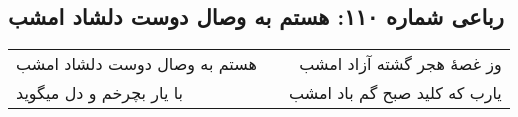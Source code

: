 \begin{center}
\section*{رباعی شماره ۱۱۰: هستم به وصال دوست دلشاد امشب}
\label{sec:0110}
\begin{longtable}{l p{0.5cm} r}
هستم به وصال دوست دلشاد امشب
&&
وز غصهٔ هجر گشته آزاد امشب
\\
با یار بچرخم و دل میگوید
&&
یارب که کلید صبح گم باد امشب
\\
\end{longtable}
\end{center}
